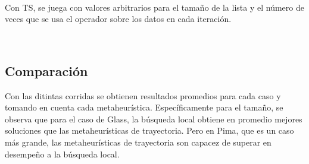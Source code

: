 \documentclass[11pt]{article}
\begin{document}
~\


Con TS, se juega con valores arbitrarios para el tamaño de la lista y el número de veces que se usa el operador sobre los datos en cada iteración.

~\

\begin{table}[h]
\caption{Entonación de parámetros TS, donde la una tupla representa (\% Error de validación, \% Tamaño al que se reduce)}
\label{tabla:2}
\end{table}

\subsection{Comparación}

Con las ditintas corridas se obtienen resultados promedios para cada caso y tomando en cuenta cada metaheurística. Específicamente para el tamaño, se observa que para el caso de Glass, la búsqueda local obtiene en promedio mejores soluciones que las metaheurísticas de trayectoria. Pero en Pima, que es un caso más grande, las metaheurísticas de trayectoria son capacez de superar en desempeño a la búsqueda local.

\begin{table}[h]
\caption{Resultados para error de validación promedio con parámetros entonados}
\label{tabla:2}
\end{table}
\end{document}
